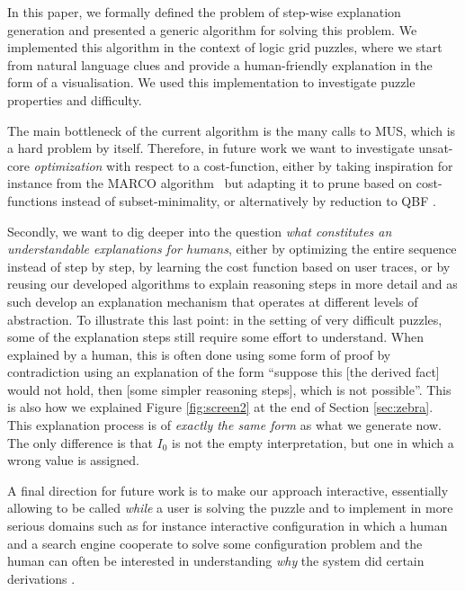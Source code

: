 In this paper, we formally defined the problem of step-wise explanation generation and presented a generic algorithm for solving this problem. 
We implemented this algorithm in the context of logic grid puzzles, where we start from natural language clues and provide a human-friendly explanation in the form of a visualisation.
We used this implementation to investigate puzzle properties and difficulty. 

The main bottleneck of the current algorithm is the many calls to MUS, which is a hard problem by itself. 
Therefore, in future work we want to investigate unsat-core \emph{optimization} with respect to a cost-function, either by taking inspiration for instance from the MARCO algorithm~\cite{liffiton2013enumerating} but adapting it to prune based on cost-functions instead of subset-minimality, or alternatively by reduction to QBF \cite{QBF}.

Secondly, we want to dig deeper into the question \emph{what constitutes an understandable explanations for humans}, either by optimizing the entire sequence instead of step by step, by learning the cost function based on user traces, or by reusing our developed algorithms to explain reasoning steps in more detail and as such develop an explanation mechanism that operates at different levels of abstraction. 
To illustrate this last point: in the setting of very difficult puzzles, some of the explanation steps still require some effort to understand. 
When explained by a human, this is often done using some form of proof by contradiction using an explanation of the form ``suppose this [the derived fact] would not hold, then [some simpler reasoning steps], which is not possible''. This is also how we explained Figure \ref{fig:screen2} at the end of Section \ref{sec:zebra}.
This explanation process is of \emph{exactly the same form} as what we generate now. The only difference is that $I_0$ is not the empty interpretation, but one in which a wrong value is assigned. 

A final direction for future work is to make our approach interactive, essentially allowing \ourtool to be called \emph{while} a user is solving the puzzle and to implement in more serious domains such as for instance interactive configuration in which a human and a search engine cooperate to solve some configuration problem and the human can often be interested in understanding \emph{why} the system did certain derivations \cite{DBLP:journals/tplp/HertumDJD17,DBLP:conf/bnaic/CarbonnelleADVD19}. 



